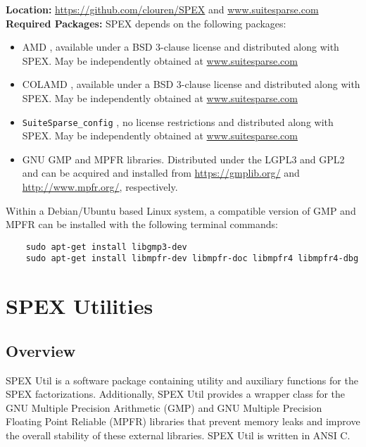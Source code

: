 \documentclass[12pt]{report}
\theoremstyle{definition}
\begin{document}
\noindent \textbf{Location:} \url{https://github.com/clouren/SPEX} and
\url{www.suitesparse.com}\\

\noindent \textbf{Required Packages:} SPEX depends on the following packages:
    \begin{itemize}
    \item AMD \cite{amestoy1996approximate,amestoy2004algorithmamd}, available under a BSD
3-clause license and distributed along with SPEX. May be independently obtained at \url{www.suitesparse.com}
    \item COLAMD \cite{davis2004column,davis2004algorithmcolamd}, available under a BSD
3-clause license and distributed along with SPEX. May be independently obtained at \url{www.suitesparse.com}
    \item
    \verb|SuiteSparse_config| \cite{davis2020suitesparse}, no license restrictions and distributed along with SPEX. May be independently obtained at \url{www.suitesparse.com}
    \item GNU GMP \cite{granlund2015gnu} and MPFR
\cite{fousse2007mpfr} libraries. Distributed under the LGPL3 and GPL2 and can be acquired and installed
from \url{https://gmplib.org/} and \url{http://www.mpfr.org/}, respectively.
    \end{itemize}

Within a Debian/Ubuntu based Linux system, a compatible version of GMP and MPFR can be installed with the following terminal commands:

{\small
\begin{verbatim}
    sudo apt-get install libgmp3-dev
    sudo apt-get install libmpfr-dev libmpfr-doc libmpfr4 libmpfr4-dbg
\end{verbatim} }


\chapter{SPEX Utilities} \label{ch:Util}

\section{Overview} \label{s:util:overview}

SPEX Util is a software package containing utility and auxiliary functions for the SPEX
factorizations. Additionally, SPEX Util provides a wrapper class for
the GNU Multiple Precision Arithmetic (GMP) \cite{granlund2015gnu} and GNU
Multiple Precision Floating Point Reliable (MPFR) \cite{fousse2007mpfr}
libraries that prevent memory leaks and improve the overall stability of
these external libraries. SPEX Util is written in ANSI C.
\end{document}
